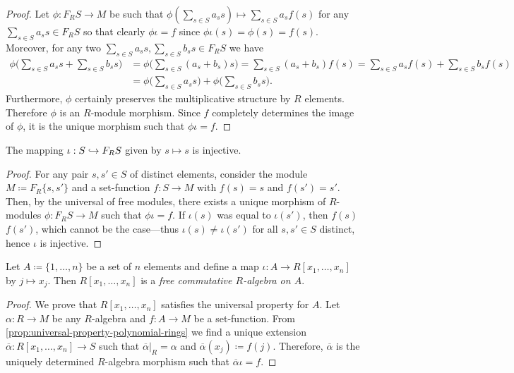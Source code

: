 \begin{proof}
Let \(\phi: F_R S \to M\) be such that
\(\phi(\sum_{s \in S} a_s s) \mapsto \sum_{s \in S} a_s f(s)\) for any
\(\sum_{s \in S} a_s s \in F_R S\) so that clearly \(\phi \iota = f\) since
\(\phi \iota(s) = \phi(s) = f(s)\). Moreover, for any two
\(\sum_{s \in S} a_s s, \sum_{s \in S} b_s s \in F_R S\) we have
\begin{align*}
\phi\bigg( \sum_{s \in S} a_s s + \sum_{s \in S} b_s s \bigg)
&= \phi\bigg( \sum_{s \in S} (a_s + b_s) s \bigg)
= \sum_{s \in S} (a_s + b_s) f(s)
= \sum_{s \in S} a_s f(s) + \sum_{s \in S} b_s f(s) \\
&= \phi\bigg( \sum_{s \in S} a_s s \bigg)
+ \phi\bigg( \sum_{s \in S} b_s s \bigg).
\end{align*}
Furthermore, \(\phi\) certainly preserves the multiplicative structure by \(R\)
elements. Therefore \(\phi\) is an \(R\)-module morphism. Since \(f\) completely
determines the image of \(\phi\), it is the unique morphism such that
\(\phi \iota = f\).
\end{proof}

\begin{corollary}
\label{cor:set-to-module-injective}
The mapping \(\iota: S \hookrightarrow F_R S\) given by \(s \mapsto s\) is injective.
\end{corollary}

\begin{proof}
For any pair \(s, s' \in S\) of distinct elements, consider the module
\(M \coloneq F_R \{s, s'\}\) and a set-function \(f: S \to M\) with \(f(s) = s\)
and \(f(s') = s'\). Then, by the universal of free modules, there exists a
unique morphism of \(R\)-modules \(\phi: F_R S \to M\) such that \(\phi \iota =
f\). If \(\iota(s)\) was equal to \(\iota(s')\), then \(f(s)\) \(f(s')\), which
cannot be the case---thus \(\iota(s) \neq \iota(s')\) for all \(s, s' \in S\)
distinct, hence \(\iota\) is injective.
\end{proof}

\begin{proposition}
\label{prop:ring-poly-is-free-commutative-R-algebra}
Let \(A \coloneq \{1, \dots, n\}\) be a set of \(n\) elements and define a map
\(\iota: A \to R[x_1, \dots, x_n]\) by \(j \mapsto x_j\). Then \(R[x_1, \dots,
x_n]\) is a \emph{free commutative \(R\)-algebra on \(A\)}.
\end{proposition}

\begin{proof}
We prove that \(R[x_1, \dots, x_n]\) satisfies the universal property for
\(A\). Let \(\alpha: R \to M\) be any \(R\)-algebra and \(f: A \to M\) be a
set-function. From \cref{prop:universal-property-polynomial-rings} we find a
unique extension \(\overline{\alpha}: R[x_1, \dots, x_n] \to S\) such that
\(\overline{\alpha}|_R = \alpha\) and \(\overline{\alpha}(x_j) \coloneq
f(j)\). Therefore, \(\overline{\alpha}\) is the uniquely determined
\(R\)-algebra morphism such that \(\overline{\alpha} \iota = f\).
\end{proof}

